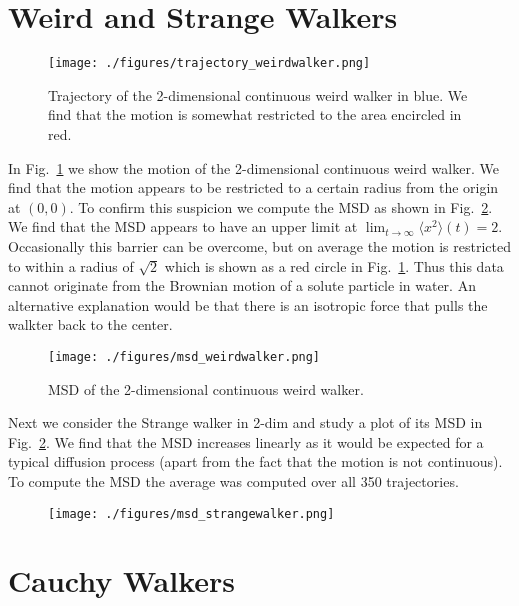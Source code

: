 \documentclass[12pt]{article}
\begin{document}
{\section{Weird and Strange Walkers}
 
\begin{figure}[H]
  \centering
    \texttt{[image: ./figures/trajectory\_weirdwalker.png]}
    \caption{Trajectory of the 2-dimensional continuous weird walker in blue. We find that the 
            motion is somewhat restricted to the area encircled in red.}
    \label{fig:abb3}
  \end{figure}
In Fig.~\ref{fig:abb3} we show the motion of the 2-dimensional continuous weird walker.
We find that the motion appears to be restricted to a certain radius from the origin at $(0,0)$.
To confirm this suspicion we compute the MSD as shown in Fig.~\ref{fig:abb4}. We find that the 
MSD appears to have an upper limit at $\lim_{t \rightarrow \infty} \langle x^2 \rangle (t) = 2$.
Occasionally this barrier can be overcome, but on average the motion is restricted to within a
radius of $\sqrt{2}$ which is shown as a red circle in Fig.~\ref{fig:abb3}. Thus this data cannot
originate from the Brownian motion of a solute particle in water. An alternative explanation would be that
there is an isotropic force that pulls the walkter back to the center.
 
 
\begin{figure}[H]
  \centering
    \texttt{[image: ./figures/msd\_weirdwalker.png]}
    \caption{MSD of the 2-dimensional continuous weird walker.}
    \label{fig:abb4}
  \end{figure}
 
 
Next we consider the Strange walker in 2-dim and study a plot of its MSD in Fig.~\ref{fig:abb4}. We find
that the MSD increases linearly as it would be expected for a typical diffusion process (apart from the fact
that the motion is not continuous). To compute the MSD the average was computed over all 350 trajectories.
 
\begin{figure}[H]
  \centering
    \texttt{[image: ./figures/msd\_strangewalker.png]}
    \label{fig:abb5}
  \end{figure}
 
 
\section{Cauchy Walkers}
 
}
\end{document}

